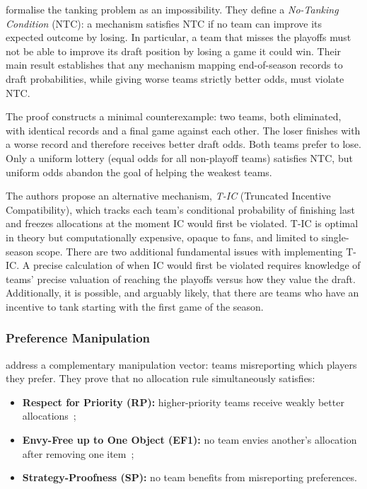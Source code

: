 \citet{munro2020notanking} formalise the tanking problem as an impossibility. They define a \emph{No-Tanking Condition} (NTC): a mechanism satisfies NTC if no team can improve its expected outcome by losing. In particular, a team that misses the playoffs must not be able to improve its draft position by losing a game it could win. Their main result establishes that any mechanism mapping end-of-season records to draft probabilities, while giving worse teams strictly better odds, must violate NTC.

The proof constructs a minimal counterexample: two teams, both eliminated, with identical records and a final game against each other. The loser finishes with a worse record and therefore receives better draft odds. Both teams prefer to lose. Only a uniform lottery (equal odds for all non-playoff teams) satisfies NTC, but uniform odds abandon the goal of helping the weakest teams.

The authors propose an alternative mechanism, \emph{T-IC} (Truncated Incentive Compatibility), which tracks each team's conditional probability of finishing last and freezes allocations at the moment IC would first be violated. T-IC is optimal in theory but computationally expensive, opaque to fans, and limited to single-season scope. There are two additional fundamental issues with implementing T-IC. A precise calculation of when IC would first be violated requires knowledge of teams' precise valuation of reaching the playoffs versus how they value the draft. Additionally, it is possible, and arguably likely, that there are teams who have an incentive to tank starting with the first game of the season.

\subsubsection{Preference Manipulation}

\citet{coreno2022axiomatic} address a complementary manipulation vector: teams misreporting which players they prefer. They prove that no allocation rule simultaneously satisfies:
\begin{itemize}
    \item \textbf{Respect for Priority (RP):} higher-priority teams receive weakly better allocations~\citep{svensson1994allocation};
    \item \textbf{Envy-Free up to One Object (EF1):} no team envies another's allocation after removing one item~\citep{lipton2004approximately,budish2011combinatorial};
    \item \textbf{Strategy-Proofness (SP):} no team benefits from misreporting preferences.
\end{itemize}

